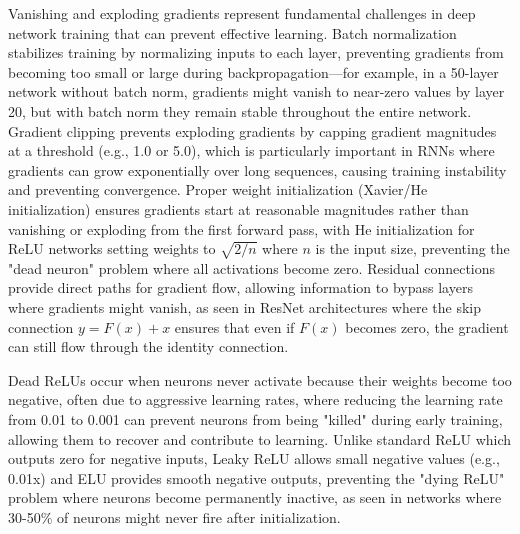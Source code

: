 Vanishing and exploding gradients represent fundamental challenges in deep network training that can prevent effective learning. Batch normalization stabilizes training by normalizing inputs to each layer, preventing gradients from becoming too small or large during backpropagation—for example, in a 50-layer network without batch norm, gradients might vanish to near-zero values by layer 20, but with batch norm they remain stable throughout the entire network. Gradient clipping prevents exploding gradients by capping gradient magnitudes at a threshold (e.g., 1.0 or 5.0), which is particularly important in RNNs where gradients can grow exponentially over long sequences, causing training instability and preventing convergence. Proper weight initialization (Xavier/He initialization) ensures gradients start at reasonable magnitudes rather than vanishing or exploding from the first forward pass, with He initialization for ReLU networks setting weights to $\sqrt{2/n}$ where $n$ is the input size, preventing the "dead neuron" problem where all activations become zero. Residual connections provide direct paths for gradient flow, allowing information to bypass layers where gradients might vanish, as seen in ResNet architectures where the skip connection $y = F(x) + x$ ensures that even if $F(x)$ becomes zero, the gradient can still flow through the identity connection.

Dead ReLUs occur when neurons never activate because their weights become too negative, often due to aggressive learning rates, where reducing the learning rate from 0.01 to 0.001 can prevent neurons from being "killed" during early training, allowing them to recover and contribute to learning. Unlike standard ReLU which outputs zero for negative inputs, Leaky ReLU allows small negative values (e.g., 0.01x) and ELU provides smooth negative outputs, preventing the "dying ReLU" problem where neurons become permanently inactive, as seen in networks where 30-50\% of neurons might never fire after initialization.

